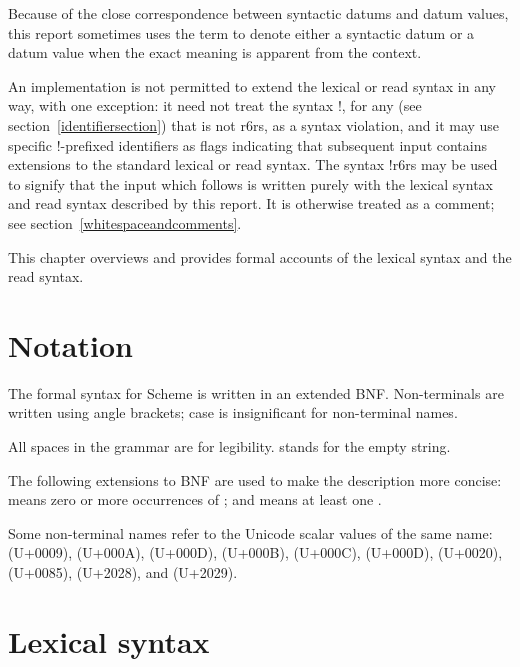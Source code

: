 Because of the close correspondence between syntactic datums and datum
values, this report sometimes uses the term  to denote
either a syntactic datum or a datum value when the exact meaning
is apparent from the context.

An implementation is not permitted to extend the lexical or read syntax in
any way, with one exception: it need not treat the syntax
{\cf \sharpsign{}!}, for any  (see
section~\ref{identifiersection}) that is not {\cf r6rs}, as a syntax
violation, and it may use specific {\cf \sharpsign{}!}-prefixed
identifiers as flags indicating that subsequent input contains extensions
to the standard lexical or read syntax. 
The syntax {\cf \sharpsign{}!r6rs} may be used to signify that
the input which follows is written purely with the lexical syntax and
read syntax described by
this report.  It is otherwise treated as a comment; see section~\ref{whitespaceandcomments}.

This chapter overviews and provides formal accounts of the lexical
syntax and the read syntax.

\section{Notation}
\label{BNF}

The formal syntax for Scheme is written in an extended BNF.
Non-terminals are written using angle brackets; case is insignificant
for non-terminal names.

All spaces in the grammar are for legibility.
 stands for the empty string.

The following extensions to BNF are used to make the description more
concise:   means zero or more occurrences of
; and  means at least one
.

Some non-terminal names refer to the Unicode scalar values of the same
name:  (U+0009),  (U+000A),
 (U+000D),  (U+000B),
 (U+000C),  (U+000D),
 (U+0020),  (U+0085),  (U+2028), and  (U+2029).

\section{Lexical syntax}
\label{lexicalsyntaxsection}

